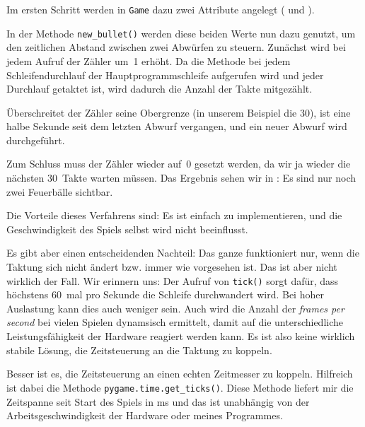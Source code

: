 Im ersten Schritt werden in \texttt{Game} dazu zwei Attribute angelegt ( und ). 



In der Methode \texttt{new\_bullet()} werden diese beiden Werte nun dazu genutzt, um den zeitlichen Abstand zwischen zwei Abwürfen zu steuern. Zunächst wird bei jedem Aufruf der Zähler um~1 erhöht. Da die Methode bei jedem Schleifendurchlauf der Hauptprogrammschleife aufgerufen wird und jeder Durchlauf getaktet ist, wird dadurch die Anzahl der Takte mitgezählt. 

Überschreitet der Zähler seine Obergrenze (in unserem Beispiel die 30), ist eine halbe Sekunde seit dem letzten Abwurf vergangen, und ein neuer Abwurf wird durchgeführt. 

Zum Schluss muss der Zähler wieder auf~0 gesetzt werden, da wir ja wieder die nächsten 30~Takte warten müssen. Das Ergebnis sehen wir in : Es sind nur noch zwei Feuerbälle sichtbar.




Die Vorteile dieses Verfahrens sind: Es ist einfach zu implementieren, und die Geschwindigkeit des Spiels selbst wird nicht beeinflusst. 

Es gibt aber einen entscheidenden Nachteil: Das ganze funktioniert nur, wenn die Taktung sich nicht ändert bzw. immer wie vorgesehen ist. Das ist aber nicht wirklich der Fall. Wir erinnern uns: Der Aufruf von \texttt{tick()} sorgt dafür, dass höchstens 60~mal pro Sekunde die Schleife durchwandert wird. Bei hoher Auslastung kann dies auch weniger sein. Auch wird die Anzahl der \emph{frames per second} bei vielen Spielen dynamsisch ermittelt, damit auf die unterschiedliche Leistungsfähigkeit der Hardware reagiert werden kann. Es ist also keine wirklich stabile Lösung, die Zeitsteuerung an die Taktung zu koppeln. 

Besser ist es, die Zeitsteuerung an einen echten Zeitmesser zu koppeln. Hilfreich ist dabei die Methode \texttt{pygame.time.get\_ticks()}. Diese Methode liefert mir die Zeitspanne seit Start des Spiels in \gls{ms} und das ist unabhängig von der Arbeitsgeschwindigkeit der Hardware oder meines Programmes.

